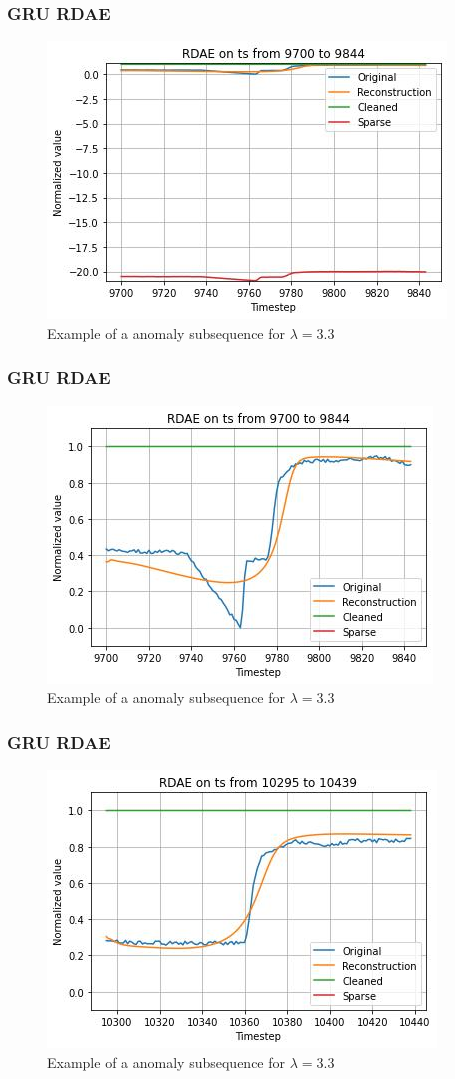 \documentclass{beamer}
\theoremstyle{plain}
\theoremstyle{definition}
\theoremstyle{remark}
\begin{document}
\begin{frame}
	\frametitle{GRU RDAE}
	\begin{figure}
		\centering
		\includegraphics[width=0.7\linewidth]{Images/GRUlam3.3ts_anomaly9700.jpg}
		\caption[]{Example of a anomaly subsequence for $\lambda=3.3$}
	\end{figure}
\end{frame}

\begin{frame}
	\frametitle{GRU RDAE}
	\begin{figure}
		\centering
		\includegraphics[width=0.7\linewidth]{Images/GRUlam3.3ts_anomalyzoom9700.jpg}
		\caption[]{Example of a anomaly subsequence for $\lambda=3.3$}
	\end{figure}
\end{frame}

\begin{frame}
	\frametitle{GRU RDAE}
	\begin{figure}
		\centering
		\includegraphics[width=0.7\linewidth]{Images/GRUlam3.3ts_anomalyzoom10295.jpg}
		\caption[]{Example of a anomaly subsequence for $\lambda=3.3$}
	\end{figure}
\end{frame}
\end{document}
